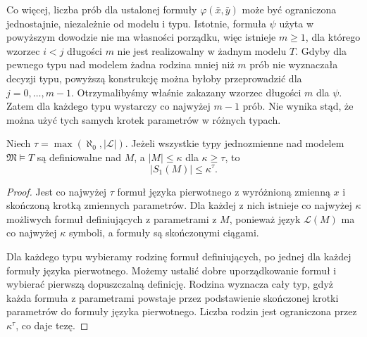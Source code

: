 Co więcej, liczba prób dla ustalonej formuły
$\varphi(\bar x,\bar y)$ może być ograniczona
jednostajnie, niezależnie od modelu i typu.
Istotnie, formuła $\psi$ użyta w powyższym dowodzie
nie ma własności porządku, więc istnieje $m\geq1$,
dla którego wzorzec $i<j$ długości $m$ nie jest
realizowalny w żadnym modelu $T$.
Gdyby dla pewnego typu nad modelem żadna rodzina
mniej niż $m$ prób nie wyznaczała decyzji typu,
powyższą konstrukcję można byłoby przeprowadzić
dla $j=0,\ldots,m-1$. Otrzymalibyśmy właśnie
zakazany wzorzec długości $m$ dla $\psi$.
Zatem dla każdego typu wystarczy co najwyżej
$m-1$ prób. Nie wynika stąd, że można użyć
tych samych krotek parametrów w różnych typach.

\begin{lemat}
\label{lem:mod-definability-count}
Niech $\tau=\max(\aleph_0,|\mathcal L|)$.
Jeżeli wszystkie typy jednozmienne nad modelem
$\mathfrak M\models T$ są definiowalne nad $M$,
a $|M|\leq\kappa$ dla $\kappa\geq\tau$, to
\[
|S_1(M)|\leq\kappa^\tau.
\]
\end{lemat}
\begin{proof}
Jest co najwyżej $\tau$ formuł języka
pierwotnego z wyróżnioną zmienną $x$
i skończoną krotką zmiennych parametrów.
Dla każdej z nich istnieje co najwyżej
$\kappa$ możliwych formuł definiujących
z parametrami z $M$, ponieważ język
$\mathcal L(M)$ ma co najwyżej $\kappa$
symboli, a formuły są skończonymi ciągami.

Dla każdego typu wybieramy rodzinę formuł
definiujących, po jednej dla każdej formuły
języka pierwotnego. Możemy ustalić dobre
uporządkowanie formuł i wybierać pierwszą
dopuszczalną definicję.
Rodzina wyznacza cały typ, gdyż każda
formuła z parametrami powstaje przez
podstawienie skończonej krotki parametrów
do formuły języka pierwotnego.
Liczba rodzin jest ograniczona przez
$\kappa^\tau$, co daje tezę.
\end{proof}


